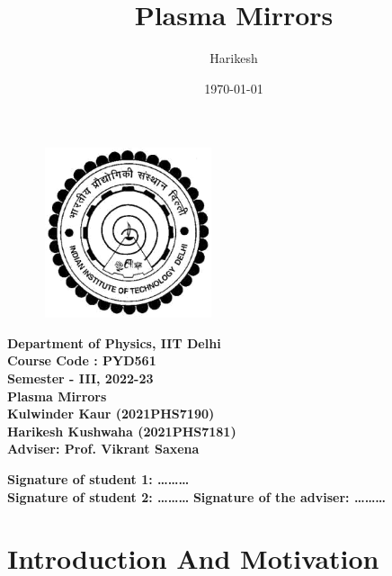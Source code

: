 \documentclass[]{article}
\title{Plasma Mirrors}
\author{Harikesh}
\date{\today}
\newenvironment{changemargin}[2]{%
\begin{list}{}{%
\setlength{\topsep}{0pt}%
\setlength{\leftmargin}{#1}%
\setlength{\rightmargin}{#2}%
\setlength{\listparindent}{\parindent}%
\setlength{\itemindent}{\parindent}%
\setlength{\parsep}{\parskip}%
}%
\item[]}{\end{list}}
\begin{document}
\begin{titlepage}
    \begin{changemargin}{-2cm}{-2cm}
        \begin{figure}
            \includegraphics[width=5cm, height=5cm]{logo.png}
            \centering
        \end{figure}
        \begin{center}
            \textbf{\Large{Department of Physics, IIT Delhi}}\\
            \vspace*{1cm}
            \textbf{\Large{Course Code : PYD561}}\\
            \vspace*{0.2cm}
            \textbf{\Large {Semester - III, 2022-23}}\\
            \vspace*{1cm}
            \textbf{\LARGE{Plasma Mirrors}}\\
            \vspace*{1cm}
            \textbf{\Large{Kulwinder Kaur (2021PHS7190)}}\\
            \vspace*{0.2cm}
            \textbf{\Large {Harikesh Kushwaha (2021PHS7181)}}\\
            \vspace*{1cm}
            \textbf{\Large {Adviser: Prof. Vikrant Saxena}}\\
            \vspace*{2cm}
        \end{center}
        \begin{flushleft}


            \textbf{Signature of student 1: \ldots \ldots \ldots}\\
            \vspace*{1cm}
            \textbf{Signature of student 2: \ldots \ldots \ldots}
            \hspace*{3cm}
            \textbf{Signature of the adviser: \ldots \ldots \ldots}
        \end{flushleft}
    \end{changemargin}
\end{titlepage}
\newpage
\section{Introduction And Motivation}
\end{document}
